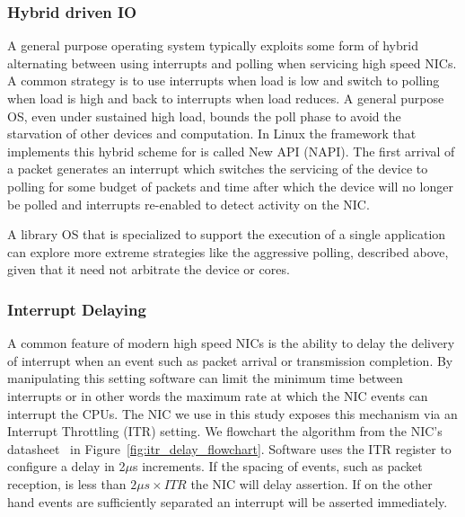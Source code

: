 \subsubsection{Hybrid driven IO}
A general purpose operating system typically exploits some form of hybrid alternating between using interrupts and polling when servicing high speed NICs. A common strategy is to use interrupts when load is low and switch to polling when load is high and back to interrupts when load reduces.  A general purpose OS, even under sustained high load, bounds the poll phase to avoid the starvation of other devices and computation.  In Linux the framework that implements this hybrid scheme for is called New API (NAPI)\cite{NAPI}.  The first arrival of a packet generates an interrupt which switches the servicing of the device to polling for some budget of packets and time after which the device will no longer be polled and interrupts re-enabled to detect activity on the NIC.  

A library OS that is specialized to support the execution of a single application can explore more extreme strategies like the aggressive polling, described above, given that it need not arbitrate the device or cores.

\subsubsection{Interrupt Delaying}

A common feature of modern high speed NICs is the ability to delay the delivery of interrupt when an event such as packet arrival or transmission completion.  By manipulating this setting software can limit the minimum time between interrupts or in other words the maximum rate at which the NIC events can interrupt the CPUs.    The NIC we use in this study exposes this mechanism via an Interrupt Throttling (ITR) setting.  We flowchart the algorithm from the NIC's datasheet~\cite{82599} in  Figure~\ref{fig:itr_delay_flowchart}. Software uses the ITR register to configure a delay in 2$\mu$s increments.  If the spacing of events, such as packet reception, is less than  $2{\mu}s \times ITR$ the NIC will delay assertion.  If on the other hand events are sufficiently separated an interrupt will be asserted immediately.   

